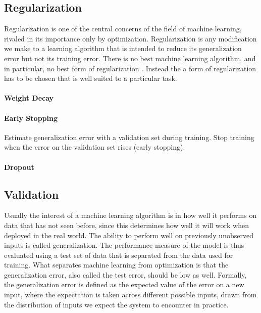\documentclass{scrartcl}
\begin{document}



\subsection{Regularization}

Regularization is one of the central concerns of the field of machine learning, rivaled in its importance only by optimization. Regularization is any modification we make to a learning algorithm that is intended to reduce its generalization error but not its training error. There is no best machine learning algorithm, and in particular, no best form of regularization \cite{Wolpert1996}. Instead the a form of regularization has to be chosen that is well suited to a particular task.



\paragraph{Weight Decay}


\paragraph{Early Stopping} 
Estimate generalization error with a validation set during training. Stop training when the error on the validation set rises (early stopping).

\paragraph{Dropout}



\subsection{Validation}

Usually the interest of a machine learning algorithm is in how well it performs on data that has not seen before, since this determines how well it will work when deployed in the real world. The ability to perform well on previously unobserved inputs is called generalization. The performance measure of the model is thus evaluated using a test set of data that is separated from the data used for training. What separates machine learning from optimization is that the generalization error, also called the test error, should be low as well. Formally, the generalization error is defined as the expected value of the error on a new input, where the expectation is taken across different possible inputs, drawn from the distribution of inputs we expect the system to encounter in practice.
\end{document}

